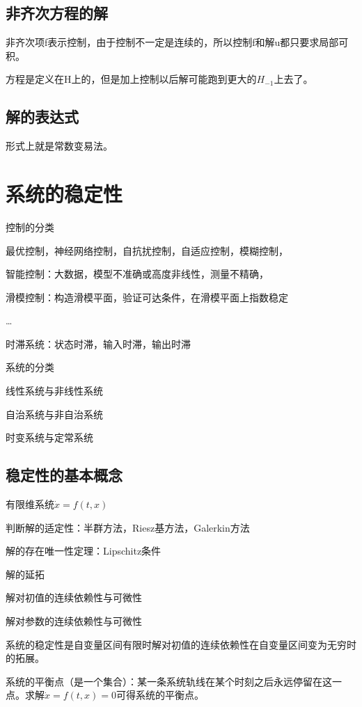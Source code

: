 \subsection{非齐次方程的解}

非齐次项f表示控制，由于控制不一定是连续的，所以控制f和解u都只要求局部可积。

方程是定义在H上的，但是加上控制以后解可能跑到更大的$H_{-1}$上去了。

\subsection{解的表达式}

形式上就是常数变易法。

\section{系统的稳定性}

控制的分类

最优控制，神经网络控制，自抗扰控制，自适应控制，模糊控制，

智能控制：大数据，模型不准确或高度非线性，测量不精确，

滑模控制：构造滑模平面，验证可达条件，在滑模平面上指数稳定

\dots

时滞系统：状态时滞，输入时滞，输出时滞

系统的分类

线性系统与非线性系统

自治系统与非自治系统

时变系统与定常系统

\subsection{稳定性的基本概念}

有限维系统$\dot x = f(t, x)$

判断解的适定性：半群方法，Riesz基方法，Galerkin方法

解的存在唯一性定理：Lipschitz条件

解的延拓

解对初值的连续依赖性与可微性

解对参数的连续依赖性与可微性

系统的稳定性是自变量区间有限时解对初值的连续依赖性在自变量区间变为无穷时的拓展。

系统的平衡点（是一个集合）：某一条系统轨线在某个时刻之后永远停留在这一点。求解$\dot x = f(t, x) = 0$可得系统的平衡点。


